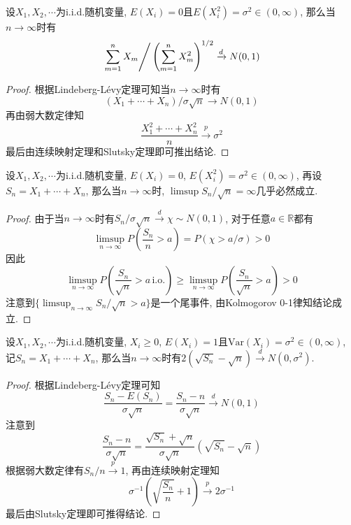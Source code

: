 \documentclass[cn, 12pt, math=mtpro2, bibstyle=apa, blue, twocol]{elegantbook}
\newcommand{\R}{\mathbb{R}}
\begin{document}
\begin{example}
设$X_1,X_2,\cdots$为i.i.d.随机变量, $E(X_i)=0$且$E(X_i^2)=\sigma^2\in (0,\infty)$, 那么当$n\to\infty$时有
$$\left.\sum_{m=1}^{n}X_m\right/\left(\sum_{m=1}^{n}X_m^2\right)^{1/2}\xrightarrow{d} N(0,1)$$
\end{example}
\begin{proof}
  根据Lindeberg-Lévy定理可知当$n\to\infty$时有
  $$(X_1+\cdots+X_n)/\sigma\sqrt{n}\to N(0,1)$$
  再由弱大数定律知
  $$\frac{X_1^2+\cdots+X_n^2}{n}\xrightarrow{p}\sigma^2$$
  最后由连续映射定理和Slutsky定理即可推出结论.
\end{proof}
\begin{example}
设$X_1,X_2,\cdots$为i.i.d.随机变量, $E(X_i)=0$, $E(X_i^2)=\sigma^2\in (0,\infty)$, 再设$S_n=X_1+\cdots+X_n$, 那么当$n\to\infty$时, $\limsup S_n/\sqrt{n}=\infty$几乎必然成立.
\end{example}
\begin{proof}
  由于当$n\to\infty$时有$S_n/\sigma\sqrt{n}\xrightarrow{d}\chi\sim N(0,1)$, 对于任意$a\in\R$都有
  $$\limsup_{n\to\infty}P\left(\frac{S_n}{n}>a\right)=P(\chi>a/\sigma)>0$$
  因此
  $$\limsup_{n\to\infty}P\left(\frac{S_n}{\sqrt{n}}>a\,\text{i.o.}\right)\geq\limsup_{n\to\infty}P\left(\frac{S_n}{\sqrt{n}}>a\right)>0$$
  注意到$\{\limsup_{n\to\infty}S_n/\sqrt{n}>a\}$是一个尾事件, 由Kolmogorov 0-1律知结论成立.
\end{proof}
\begin{example}
设$X_1,X_2,\cdots$为i.i.d.随机变量, $X_i\ge0$, $E(X_i)=1$且$\text{Var}(X_i)=\sigma^2\in (0,\infty)$, 记$S_n=X_1+\cdots+X_n$, 那么当$n\to\infty$时有$2(\sqrt{S_n}-\sqrt{n})\xrightarrow{d}N(0,\sigma^2)$.
\end{example}
\begin{proof}
  根据Lindeberg-Lévy定理可知
  $$\frac{S_n-E(S_n)}{\sigma\sqrt{n}}=\frac{S_n-n}{\sigma\sqrt{n}}\xrightarrow{d}N(0,1)$$
  注意到
  $$\frac{S_n-n}{\sigma\sqrt{n}}=\frac{\sqrt{S_n}+\sqrt{n}}{\sigma\sqrt{n}}(\sqrt{S_n}-\sqrt{n})$$
  根据弱大数定律有$S_n/n\xrightarrow{p}1$, 再由连续映射定理知
  $$\sigma^{-1}\left(\sqrt{\frac{S_n}{n}}+1\right)\xrightarrow{p}2\sigma^{-1}$$
  最后由Slutsky定理即可推得结论.
\end{proof}
\end{document}
